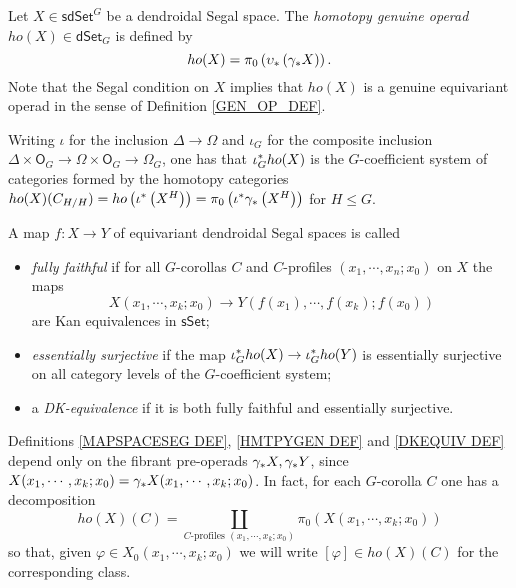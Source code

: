 \documentclass[a4paper,10pt
]{article}%
\begin{document}
\begin{definition}\label{HMTPYGEN DEF}
	Let $X \in \mathsf{sdSet}^G$ be a dendroidal Segal space.
	The \textit{homotopy genuine operad} 
	$ho(X)\in \mathsf{dSet}_G$ is defined
by
	\[
	ho(X) = \pi_0 \left( \upsilon_{\**} \left( \gamma_{\**}X \right) \right).
	\]
Note that the Segal condition on $X$ implies that 
$ho(X)$ is a genuine equivariant operad in the sense of
Definition \ref{GEN_OP_DEF}.
\end{definition}


\begin{remark}
	Writing $\iota$ for the inclusion $\Delta \to \Omega$
	and $\iota_G$ for the composite inclusion
	$\Delta \times \mathsf{O}_G \to 
	\Omega \times \mathsf{O}_G \to
	\Omega_G$,
	one has that $\iota_G^{\**}ho(X)$ is the $G$-coefficient system of categories formed by the homotopy categories
	$ho(X)(C_{H/H})=
	ho \left(\iota^{\**}\left(X^H\right)\right) = 
	\pi_0 \left(\iota^{\**} \gamma_{\**}
	\left(X^H\right)\right)$ for $H \leq G$.
\end{remark}

\begin{definition}\label{DKEQUIV DEF}
	A map $f \colon X \to Y$ of equivariant dendroidal Segal spaces is called 
\begin{itemize}
	\item \textit{fully faithful} if for all $G$-corollas $C$ and $C$-profiles $(x_1,\cdots,x_n;x_0)$ on $X$ the maps
\[
	X(x_1,\cdots,x_k;x_0) \to
	Y\left(f(x_1),\cdots,f(x_k);f(x_0)\right)
\]
are Kan equivalences in $\mathsf{sSet}$;
	\item \textit{essentially surjective} if
	the map $\iota_G^{\**}ho(X) \to \iota_G^{\**}ho(Y)$
	is essentially surjective on all category levels of the $G$-coefficient system;
	\item a \textit{DK-equivalence} if it is both fully faithful and essentially surjective.
\end{itemize}
\end{definition}


\begin{remark}\label{ONLYPREOP REM}
Definitions \ref{MAPSPACESEG DEF}, \ref{HMTPYGEN DEF} and \ref{DKEQUIV DEF} depend only on the 
fibrant pre-operads $\gamma_{\**}X,\gamma_{\**}Y$,
since $X(x_1,\cdots,x_k;x_0) = \gamma_{\**}X(x_1,\cdots,x_k;x_0)$.
In fact, for each $G$-corolla $C$
one has a decomposition
\[
	ho(X)(C)=
	\coprod_{\text{$C$-profiles }(x_1,\cdots,x_k;x_0)}
	\pi_0 \left( X(x_1,\cdots,x_k;x_0) \right)
\]
so that, given $\varphi \in X_0(x_1,\cdots,x_k;x_0)$
we will write $[\varphi] \in ho(X)(C)$
for the corresponding class.
\end{remark}
\end{document}

